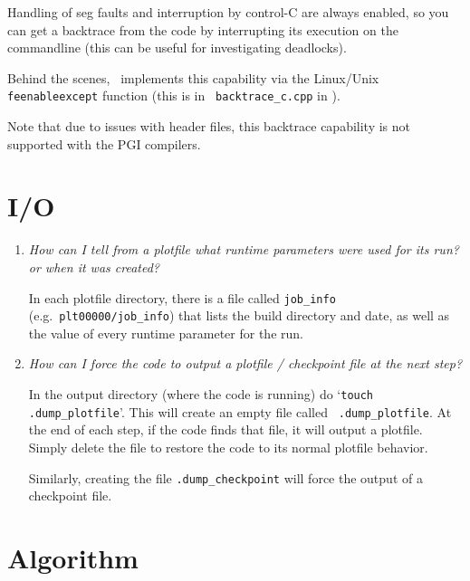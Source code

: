 \begin{enumerate}
Handling of seg faults and interruption by control-C are always
enabled, so you can get a backtrace from the code by interrupting its
execution on the commandline (this can be useful for investigating
deadlocks).

Behind the scenes, \boxlib\ implements this capability via the
Linux/Unix {\tt feenableexcept} function (this is in {\tt
  backtrace\_c.cpp} in \boxlib).

Note that due to issues with header files, this backtrace capability
is not supported with the PGI compilers.


\end{enumerate}


\section{I/O}

\begin{enumerate}


\item {\em How can I tell from a plotfile what runtime parameters were
   used for its run? or when it was created?}

   In each plotfile directory, there is a file called {\tt job\_info}
   (e.g.\ {\tt plt00000/job\_info}) that lists the build directory and
   date, as well as the value of every runtime parameter for the run.


\item {\em How can I force the code to output a plotfile / checkpoint
  file at the next step?}

   In the output directory (where the code is running) do `{\tt touch
     .dump\_plotfile}'.  This will create an empty file called {\tt
     .dump\_plotfile}.  At the end of each step, if the code finds
   that file, it will output a plotfile.  Simply delete the file to
   restore the code to its normal plotfile behavior.

   Similarly, creating the file {\tt .dump\_checkpoint} will force the
   output of a checkpoint file.  

\end{enumerate}



\section{Algorithm}

